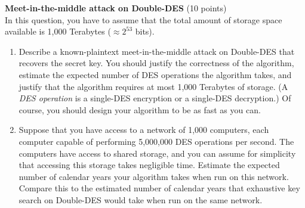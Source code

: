 \begin{problem}{\bf Meet-in-the-middle attack on Double-DES} (10 points)\\
In this question, you have to assume that the total amount of storage
space available is 1,000 Terabytes ($\approx 2^{53}$ bits).
\begin{enumerate}[label=(\alph*)]
\item Describe a known-plaintext meet-in-the-middle attack on Double-DES
that recovers the secret key. You should justify the correctness
of the algorithm, estimate the expected number of DES operations
the algorithm takes, and justify that the algorithm requires at most
1,000 Terabytes of storage. (A \emph{DES operation} is a
single-DES encryption or a single-DES decryption.) Of course,
you should design your algorithm to be as fast as you can.

\item Suppose that you have access to a network of 1,000 computers, each
computer capable of performing 5,000,000 DES operations per second.
The computers have access to shared storage, and you can assume
for simplicity that accessing this storage takes negligible time.
Estimate the expected number of calendar years your algorithm takes
when run on this network. Compare this to the estimated number of
calendar years that exhaustive key search on Double-DES would take
when run on the same network.
\end{enumerate}
\end{problem}


